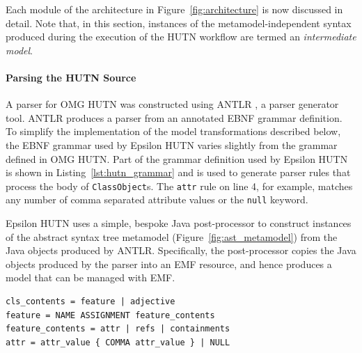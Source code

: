 Each module of the architecture in Figure~\ref{fig:architecture} is now discussed in detail. Note that, in this section, instances of the metamodel-independent syntax produced during the execution of the HUTN workflow are termed an \textit{intermediate model}.

\paragraph{Parsing the HUTN Source}
A parser for OMG HUTN was constructed using ANTLR \cite{parr07antlr}, a parser generator tool. ANTLR produces a parser from an annotated EBNF grammar definition. To simplify the implementation of the model transformations described below, the EBNF grammar used by Epsilon HUTN varies slightly from the grammar defined in OMG HUTN. Part of the grammar definition used by Epsilon HUTN is shown in Listing~\ref{lst:hutn_grammar} and is used to generate parser rules that process the body of \texttt{Cl\-a\-ssOb\-je\-ct}s. The \texttt{attr} rule on line 4, for example, matches any number of comma separated attribute values or the \texttt{null} keyword.

Epsilon HUTN uses a simple, bespoke Java post-processor to construct instances of the abstract syntax tree metamodel (Figure~\ref{fig:ast_metamodel}) from the Java objects produced by ANTLR. Specifically, the post-processor copies the Java objects produced by the parser into an EMF resource, and hence produces a model that can be managed with EMF.

\begin{lstlisting}[caption=An extract of the Epsilon HUTN grammar definition in EBNF, label=lst:hutn_grammar, language=EBNF]
cls_contents = feature | adjective
feature = NAME ASSIGNMENT feature_contents
feature_contents = attr | refs | containments
attr = attr_value { COMMA attr_value } | NULL
\end{lstlisting}

